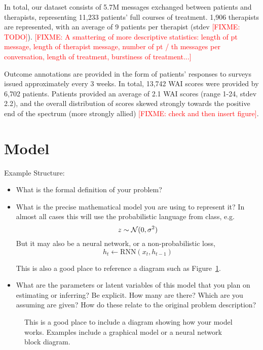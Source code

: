 \documentclass{article}
\newcommand{\fixme}[1]{\textcolor{red}{[FIXME: #1]}}
\begin{document}
In total, our dataset consists of 5.7M messages exchanged between patients and therapists, representing 11,233 patients' full courses of treatment. 1,906 therapists are represented, with an average of 9 patients per therapist (stdev \fixme{TODO}). \fixme{A smattering of more descriptive statistics: length of pt message, length of therapist message, number of pt / th messages per conversation, length of treatment, burstiness of treatment...}

Outcome annotations are provided in the form of patients' responses to surveys issued approximately every 3 weeks. In total, 13,742 WAI scores were provided by 6,702 patients. Patients provided an average of 2.1 WAI scores (range 1-24, stdev 2.2), and the overall distribution of scores skewed strongly towards the positive end of the spectrum (more strongly allied) \fixme{check and then insert figure}.


\section{Model}

Example Structure:

\begin{itemize}
\item What is the formal definition of your problem?
\item What is the precise mathematical model you are using to represent it? In almost all cases this will use the probabilistic language from class, e.g.
  \begin{equation}
  z \sim {\cal N}(0, \sigma^2)\label{eq:1}
\end{equation}
But it may also be a neural network, or a non-probabilistic loss,
\[ h_t \gets \mathrm{RNN}(x_{t}, h_{t-1} )\]

This is also a good place to reference a diagram such as Figure~\ref{fig:diagram}.

\item What are the parameters or latent variables of this model that you plan on estimating or inferring? Be explicit. How many are there? Which are you assuming are given? How do these relate to the original problem description?
\end{itemize}


\begin{figure}
  \centering
  \missingfigure[figheight=8cm]{}
  \caption{\label{fig:diagram} This is a good place to include a diagram showing how your model works. Examples include a graphical model or a neural network block diagram.}
\end{figure}
\end{document}
